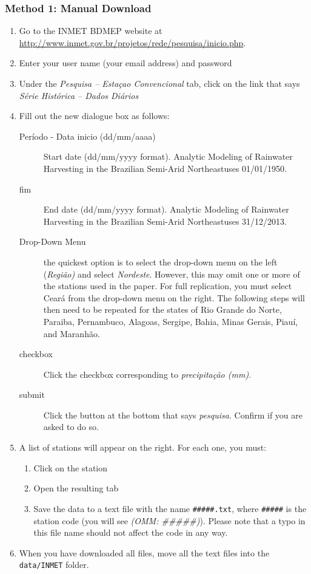 \documentclass[11pt]{article} %
\newcommand{\fn}[1]{\texttt{#1}} %
\newcommand{\code}[1]{\texttt{#1}} %
\newcommand{\usee}[1]{\textit{#1}} %
\newcommand{\thepaper}{Analytic Modeling of Rainwater Harvesting in the Brazilian Semi-Arid Northeast}
\begin{document}
\subsubsection{Method 1: Manual Download}
\begin{enumerate}
\item Go to the \ac{INMET} \ac{BDMEP} website at \url{http://www.inmet.gov.br/projetos/rede/pesquisa/inicio.php}.
\item Enter your user name (your email address) and password
\item Under the \usee{Pesquisa -- Esta\c{c}ao Convencional} tab, click on the link that says \usee{S\'{e}rie Hist\'{o}rica -- Dados Di\'{a}rios}

\item Fill out the new dialogue box as follows:
\begin{description}
\item[Per\'{i}odo - Data inicio (dd/mm/aaaa)] Start date (dd/mm/yyyy format). \thepaper uses 01/01/1950.
\item[fim] End date (dd/mm/yyyy format). \thepaper uses 31/12/2013.
\item[Drop-Down Menu] the quickest option is to select the drop-down menu on the left (\usee{Regi\~{a}o)} and select \usee{Nordeste}. However, this may omit one or more of the stations used in the paper. For full replication, you must select Cear\'{a} from the drop-down menu on the right. The following steps will then need to be repeated for the states of Rio Grande do Norte, Paraiba, Pernambuco, Alagoas, Sergipe, Bahia, Minas Gerais, Piau\'{i}, and Maranh\~{a}o.
\item[checkbox] Click the checkbox corresponding to \usee{precipita\c{c}\~{a}o (mm)}.
\item[submit] Click the button at the bottom that says \usee{pesquisa}. Confirm if you are asked to do so.
\end{description}

\item A list of stations will appear on the right. For each one, you must:
\begin{enumerate}
\item Click on the station
\item Open the resulting tab
\item Save the data to a text file with the name \code{\#\#\#\#\#.txt}, where \code{\#\#\#\#\#} is the station code (you will see \usee{(OMM: \#\#\#\#\#)}). Please note that a typo in this file name should not affect the code in any way.
\end{enumerate}
\item When you have downloaded all files, move all the text files into the \fn{data/INMET} folder. 
\end{enumerate}
\end{document}
